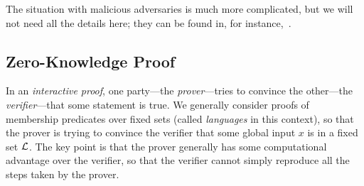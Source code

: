 The situation with malicious adversaries is much more complicated, but we will
not need all the details here; they can be found in, for instance,~\cite[Section
4]{lindell-2017}.




\subsection{Zero-Knowledge Proof}
\label{sec:zkp}

In an \emph{interactive proof}, one party---the \emph{prover}---tries to
convince the other---the \emph{verifier}---that some statement is true. We
generally consider proofs of membership predicates over fixed sets (called
\emph{languages} in this context), so that the prover is trying to convince the
verifier that some global input $x$ is in a fixed set $\mathcal{L}$. The key point is
that the prover generally has some computational advantage over the verifier, so
that the verifier cannot simply reproduce all the steps taken by the prover.

